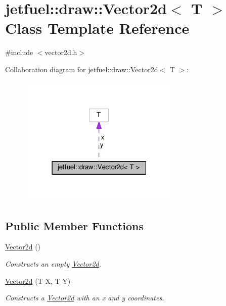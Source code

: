 \hypertarget{classjetfuel_1_1draw_1_1Vector2d}{}\section{jetfuel\+:\+:draw\+:\+:Vector2d$<$ T $>$ Class Template Reference}
\label{classjetfuel_1_1draw_1_1Vector2d}


{\ttfamily \#include $<$vector2d.\+h$>$}



Collaboration diagram for jetfuel\+:\+:draw\+:\+:Vector2d$<$ T $>$\+:
\nopagebreak
\begin{figure}[H]
\begin{center}
\leavevmode
\includegraphics[width=219pt]{classjetfuel_1_1draw_1_1Vector2d__coll__graph}
\end{center}
\end{figure}
\subsection*{Public Member Functions}
\begin{DoxyCompactItemize}
\item 
\hyperlink{classjetfuel_1_1draw_1_1Vector2d_a99950184603c690d3f73753ff3a6500a}{Vector2d} ()
\begin{DoxyCompactList}\small\item\em Constructs an empty \hyperlink{classjetfuel_1_1draw_1_1Vector2d}{Vector2d}. \end{DoxyCompactList}\item 
\hyperlink{classjetfuel_1_1draw_1_1Vector2d_a4d083d396d055fab0385f2230177c386}{Vector2d} (T X, T Y)
\begin{DoxyCompactList}\small\item\em Constructs a \hyperlink{classjetfuel_1_1draw_1_1Vector2d}{Vector2d} with an x and y coordinates. \end{DoxyCompactList}\end{DoxyCompactItemize}
